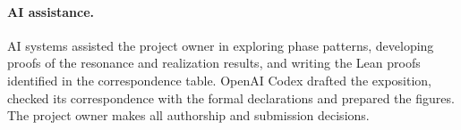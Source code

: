 \documentclass[11pt]{article}
\begin{document}
\paragraph{AI assistance.} AI systems assisted the project owner in exploring phase patterns, developing proofs of the resonance and realization results, and writing the Lean proofs identified in the correspondence table. OpenAI Codex drafted the exposition, checked its correspondence with the formal declarations and prepared the figures. The project owner makes all authorship and submission decisions.


\begingroup
\let\originalbibliography\thebibliography
\renewcommand{\thebibliography}[1]{\originalbibliography{#1}\small\setlength{\itemsep}{2pt}}

\endgroup
\end{document}
